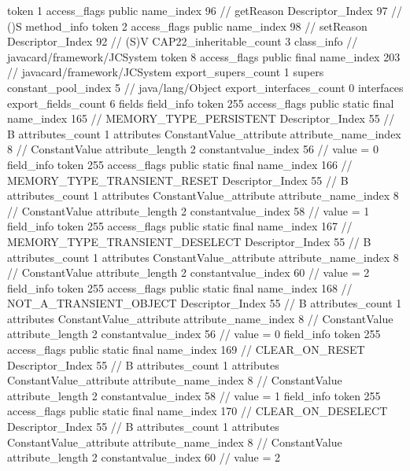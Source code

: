 {{{{{					token	1
					access_flags	public
					name_index	96		// getReason
					Descriptor_Index	97		// ()S
				}
				method_info {
					token	2
					access_flags	public
					name_index	98		// setReason
					Descriptor_Index	92		// (S)V
				}
			}
			CAP22_inheritable_count	3
		}
		class_info {		// javacard/framework/JCSystem
			token	8
			access_flags	public final
			name_index	203		// javacard/framework/JCSystem
			export_supers_count	1
			supers {
				constant_pool_index	5		// java/lang/Object
			}
			export_interfaces_count	0
			interfaces {
			}
			export_fields_count	6
			fields {
			field_info {
				token	255
				access_flags	public static final
				name_index	165		// MEMORY_TYPE_PERSISTENT
				Descriptor_Index	55		// B
				attributes_count	1
				attributes {
				ConstantValue_attribute {
					attribute_name_index	8		// ConstantValue
					attribute_length	2
					constantvalue_index	56		// value = 0
				}
				}
			}
			field_info {
				token	255
				access_flags	public static final
				name_index	166		// MEMORY_TYPE_TRANSIENT_RESET
				Descriptor_Index	55		// B
				attributes_count	1
				attributes {
				ConstantValue_attribute {
					attribute_name_index	8		// ConstantValue
					attribute_length	2
					constantvalue_index	58		// value = 1
				}
				}
			}
			field_info {
				token	255
				access_flags	public static final
				name_index	167		// MEMORY_TYPE_TRANSIENT_DESELECT
				Descriptor_Index	55		// B
				attributes_count	1
				attributes {
				ConstantValue_attribute {
					attribute_name_index	8		// ConstantValue
					attribute_length	2
					constantvalue_index	60		// value = 2
				}
				}
			}
			field_info {
				token	255
				access_flags	public static final
				name_index	168		// NOT_A_TRANSIENT_OBJECT
				Descriptor_Index	55		// B
				attributes_count	1
				attributes {
				ConstantValue_attribute {
					attribute_name_index	8		// ConstantValue
					attribute_length	2
					constantvalue_index	56		// value = 0
				}
				}
			}
			field_info {
				token	255
				access_flags	public static final
				name_index	169		// CLEAR_ON_RESET
				Descriptor_Index	55		// B
				attributes_count	1
				attributes {
				ConstantValue_attribute {
					attribute_name_index	8		// ConstantValue
					attribute_length	2
					constantvalue_index	58		// value = 1
				}
				}
			}
			field_info {
				token	255
				access_flags	public static final
				name_index	170		// CLEAR_ON_DESELECT
				Descriptor_Index	55		// B
				attributes_count	1
				attributes {
				ConstantValue_attribute {
					attribute_name_index	8		// ConstantValue
					attribute_length	2
					constantvalue_index	60		// value = 2
}}}}}}}
